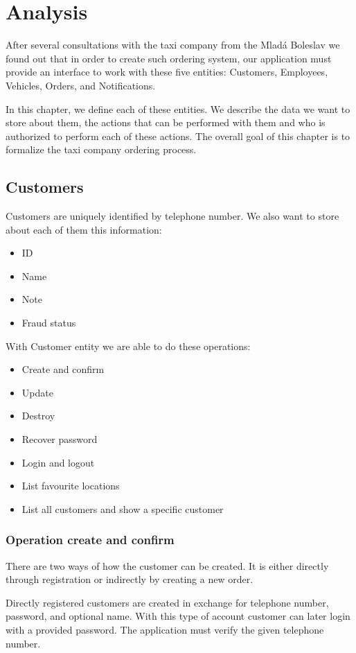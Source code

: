 \chapter{Analysis}
    After several consultations with the taxi company from the Mladá Boleslav we found out that in order to create such ordering system, our application must provide an interface to work with these five entities: Customers, Employees, Vehicles, Orders, and Notifications. 

In this chapter, we define each of these entities. We describe the data we want to store about them, the actions that can be performed with them and who is authorized to perform each of these actions. The overall goal of this chapter is to formalize the taxi company ordering process.
	
	
	\section{Customers}
		Customers are uniquely identified by telephone number. We also want to store about each of them this information:
		\begin{itemize}
			\item ID
			\item Name
			\item Note
			\item Fraud status
		\end{itemize}
	
		With Customer entity we are able to do these operations:
		\begin{itemize}
			\item Create and confirm
			\item Update
			\item Destroy
			\item Recover password
			\item Login and logout
			\item List favourite locations
			\item List all customers and show a specific customer
		\end{itemize}
		\subsection{Operation create and confirm}
			There are two ways of how the customer can be created. It is either directly through registration or indirectly by creating a new order.
			
			Directly registered customers are created in exchange for telephone number, password, and optional name. With this type of account customer can later login with a provided password. The application must verify the given telephone number.
			
